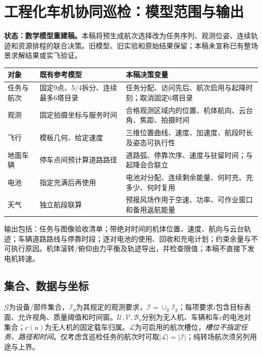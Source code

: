 \section{工程化车机协同巡检：模型范围与输出}
\noindent\textbf{状态：数学模型重建稿。}本稿将预生成航次选择改为任务序列、观测位姿、连续轨迹和资源排程的联合决策。旧模型、旧实验和原始结果保留；本稿未宣称已有整场景求解结果或实飞验证。

\begin{center}\small
\begin{tabular}{p{.17\linewidth}p{.34\linewidth}p{.39\linewidth}}\toprule
对象 & 既有参考模型 & 本稿决策变量\\\midrule
任务与航次 & 固定9点、5/4拆分、连续最多6塔目录 & 任务分配、访问先后、航次启用与起降时刻；取消固定6塔目录\\
观测 & 固定拍摄坐标与服务时间 & 合格观测区域内的位置、机体航向、云台角、焦距、拍摄时间\\
飞行 & 模板几何、给定速度 & 三维位置曲线、速度、加速度、航段时长及姿态可执行性\\
地面车辆 & 停车点间预计算道路路径 & 道路弧、停靠次序、速度与驻留时间；与起降会合联立\\
电池 & 指定充满后再使用 & 电池对分配、连续剩余能量、何时充、充多少、何时复用\\
天气 & 独立航段联算 & 预报风场作用于空速、功率、可作业窗口和备用返航能量\\\bottomrule
\end{tabular}
\end{center}

\noindent 输出包括：任务与图像验收清单；带绝对时间的机体位置、速度、航向与云台轨迹；车辆道路路线与停靠时段；逐对电池的使用、回收和充电计划；约束余量与不可执行原因。机体滚转/俯仰由力平衡及轨迹导出，并检查限值；本稿不直接下发电机转速。

\subsection{集合、数据与坐标}
\noindent $\mathcal G$为设备/部件集合，$\mathcal I_g$为其规定的观测要求，$\mathcal I=\cup_g\mathcal I_g$；每项要求$i$包含目标表面、允许视角、质量阈值和时间窗。$\mathcal U,\mathcal V,\mathcal B_v$分别为无人机、车辆和车$v$的电池对集合；$c(u)$为无人机的固定载车归属。$\mathcal L$为可启用的航次槽位，\emph{槽位不指定任务、路径和时间}。仅考虑含巡检任务的航次时可取$|\mathcal L|=|\mathcal I|$；纯转场航次须另列用途与上界。

